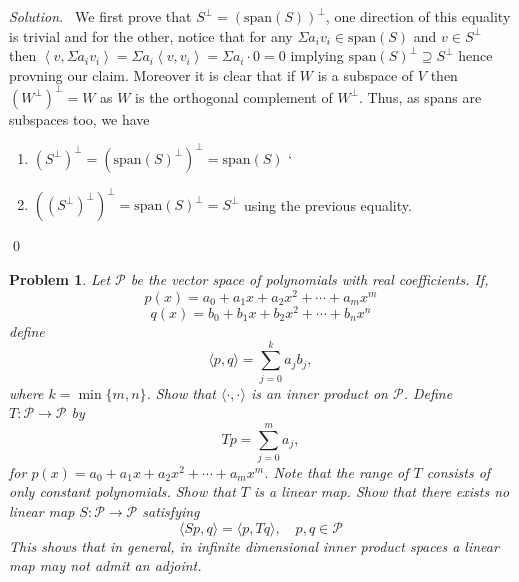 \documentclass[12pt,a4paper]{article}
\newenvironment{solution}{%
  \par\noindent\textit{Solution.}\ }{\qed}
\theoremstyle{problemstyle}
\newtheorem{problem}{Problem}[section]
\newcommand{\ipp}[1]{{\left\langle{#1}\right\rangle}}
\begin{document}
\begin{solution}
	We first prove that $S^\perp=(\text{span}(S))^\perp$, one direction of this equality is trivial and for the other, notice that for any $\Sigma a_iv_i\in\text{span}(S)$ and $v\in S^\perp$ then $\ipp{v,\Sigma a_iv_i}=\Sigma a_i\ipp{v,v_i}=\Sigma a_i\cdot 0=0$ implying $\text{span}(S)^\perp\supseteq S^\perp$ hence provning our claim. Moreover it is clear that if $W$ is a subspace of $V$ then $(W^\perp)^\perp=W$ as $W$ is the orthogonal complement of $W^\perp$. Thus, as spans are subspaces too, we have
\begin{enumerate}
	\item[(i)] $(S^\perp)^\perp=(\text{span}(S)^\perp)^\perp=\text{span}(S)$
`	\item[(ii)] $((S^\perp)^\perp)^\perp=\text{span}(S)^\perp=S^\perp$ using the previous equality.
\end{enumerate}
\end{solution}
\begin{problem}\label{prob:2-10}
Let $\mathcal{P}$ be the vector space of polynomials with real coefficients. If, 
$$p(x)=a_{0}+a_{1}x+a_{2}x^{2}+\cdots+a_{m}x^{m}$$
$$q(x)=b_{0}+b_{1}x+b_{2}x^{2}+\cdots+b_{n}x^{n}$$
define
$$\langle p,q\rangle=\sum_{j=0}^{k}a_{j}b_{j},$$
where $k=\min\{m,n\}$. Show that $\langle\cdot,\cdot\rangle$ is an inner product on $\mathcal{P}$. Define $T: \mathcal{P}\rightarrow\mathcal{P}$ by
$$Tp=\sum_{j=0}^{m}a_{j},$$
for $p(x)=a_{0}+a_{1}x+a_{2}x^{2}+\cdots+a_{m}x^{m}$. Note that the range of $T$ consists of only constant polynomials. Show that $T$ is a linear map. Show that there exists no linear map $S:\mathcal{P}\rightarrow\mathcal{P}$ satisfying
$$\langle Sp,q\rangle=\langle p,Tq\rangle, \quad p,q \in \mathcal{P}$$
This shows that in general, in infinite dimensional inner product spaces a linear map may not admit an adjoint.
\end{problem}
\end{document}

